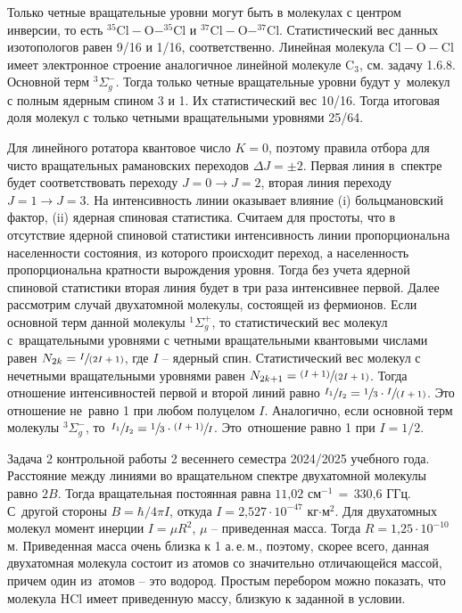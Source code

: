  Только четные вращательные уровни могут быть в молекулах с центром инверсии, то есть $^{35}\text{Cl}-\text{O}-^{35}\text{Cl}$ и $^{37}\text{Cl}-\text{O}-^{37}\text{Cl}$. Статистический вес данных изотопологов равен 9/16 и 1/16, соответственно. Линейная молекула $\text{Cl}-\text{O}-\text{Cl}$ имеет электронное строение аналогичное линейной молекуле $\text{C}_3$, см. задачу 1.6.8. Основной терм $^3\Sigma^-_g$. Тогда только четные вращательные уровни будут у~молекул с полным ядерным спином 3 и 1. Их статистический вес 10/16. Тогда итоговая доля молекул с только четными вращательными уровнями 25/64.\par
{} Для линейного ротатора квантовое число $K=0$, поэтому правила отбора для чисто вращательных рамановских переходов $\Delta J = \pm 2$. Первая линия в~спектре будет соответствовать переходу $J = 0 \rightarrow J = 2$, вторая линия переходу $J = 1 \rightarrow J = 3$. На интенсивность линии оказывает влияние (i) больцмановский фактор, (ii) ядерная спиновая статистика. Считаем для простоты, что в отсутствие ядерной спиновой статистики интенсивность линии пропорциональна населенности состояния, из которого происходит переход, а населенность пропорциональна кратности вырождения уровня. Тогда без учета ядерной спиновой статистики вторая линия будет в три раза интенсивнее первой. Далее рассмотрим случай двухатомной молекулы, состоящей из фермионов. Если основной терм данной молекулы $^1\Sigma^+_g$, то статистический вес молекул с~вращательными уровнями с четными вращательными квантовыми числами равен $N_{2k}=\sfrac{I}{(2I+1)}$, где $I$ – ядерный спин. Статистический вес молекул с нечетными вращательными уровнями равен $N_{2k+1}=\sfrac{(I+1)}{(2I+1)}$. Тогда отношение интенсивностей первой и второй линий равно $\sfrac{I_1}{I_2}=\sfrac{1}{3}\cdot\sfrac{I}{(I+1)}$. Это отношение не~равно 1 при любом полуцелом $I$. Аналогично, если основной терм молекулы $^3\Sigma^-_g$, то~$\sfrac{I_1}{I_2}=\sfrac{1}{3}\cdot\sfrac{(I+1)}{I}$. Это~отношение равно 1 при $I=1/2$.\par
{} Задача 2 контрольной работы 2 весеннего семестра 2024/2025 учебного года. Расстояние между линиями во вращательном спектре двухатомной молекулы равно $2B$. Тогда вращательная постоянная равна $\text{11,02}$ см$^{-\text{1}}\,=\, \text{330,6}$ ГГц. С~другой стороны $B=\hbar/4\pi I$, откуда $I = \text{2,527}\cdot\text{10}^{-\text{47}}$ кг$\cdot$м$^2$. Для двухатомных молекул момент инерции $I=\mu R^2$, $\mu$ – приведенная масса. Тогда $R=\text{1,25}\cdot\text{10}^{-\text{10}}$ м. Приведенная масса очень близка к 1 а.\,е.\,м., поэтому, скорее всего, данная двухатомная молекула состоит из атомов со значительно отличающейся массой, причем один из~атомов – это водород. Простым перебором можно показать, что молекула $\text{HCl}$ имеет приведенную массу, близкую к заданной в условии.\par
